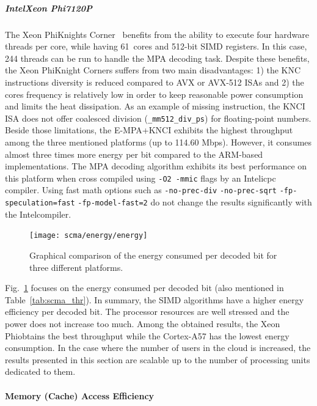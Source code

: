 \subparagraph{Intel\R Xeon Phi\TM 7120P}

The Xeon Phi\TM Knights Corner~\cite{Chrysos2012} benefits from the ability to
execute four hardware threads per core, while having 61~cores and 512-bit SIMD
registers. In this case, 244 threads can be run to handle the MPA decoding task.
Despite these benefits, the Xeon Phi\TM Knight Corners suffers from two main
disadvantages: 1) the KNC instructions diversity is reduced compared to AVX or
AVX-512 ISAs and 2) the cores frequency is relatively low in order to keep
reasonable power consumption and limits the heat dissipation. As an example of
missing instruction, the KNCI ISA does not offer coalesced division
(\verb|_mm512_div_ps|) for floating-point numbers. Beside those limitations,
the E-MPA+KNCI exhibits the highest throughput among the three mentioned
platforms (up to 114.60 Mbps). However, it consumes almost three times more
energy per bit compared to the ARM\R-based implementations. The MPA decoding
algorithm exhibits its best performance on this platform when cross compiled
using \verb|-O2 -mmic| flags by an Intel\R icpc compiler. Using fast math
options such as \verb|-no-prec-div| \verb|-no-prec-sqrt|
\verb|-fp-speculation=fast| \verb|-fp-model-fast=2| do not change the results
significantly with the Intel\R compiler.

\begin{figure}
  \centering
  \texttt{[image: scma/energy/energy]}
  \caption{Graphical comparison of the energy consumed per decoded bit for
           three different platforms.}
  \label{plot:scma_energy}
\end{figure}

Fig.~\ref{plot:scma_energy} focuses on the energy consumed per decoded bit (also
mentioned in Table~\ref{tab:scma_thr}). In summary, the SIMD algorithms have
a higher energy efficiency per decoded bit. The processor resources are well
stressed and the power does not increase too much. Among the obtained results,
the Xeon Phi\TM obtains the best throughput while the Cortex-A57 has the lowest
energy consumption. In the case where the number of users in the cloud is
increased, the results presented in this section are scalable up to the number
of processing units dedicated to them.

\paragraph{Memory (Cache) Access Efficiency}
\label{sec:scma_performance_memory}

